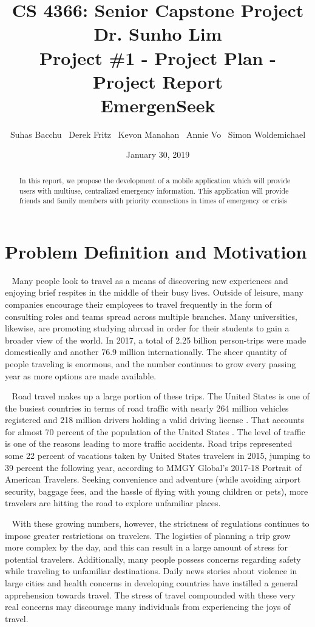 \documentclass[10pt]{article}
\title{CS 4366: Senior Capstone Project \\ Dr. Sunho Lim \\ Project \#1 - Project Plan - Project Report \\ EmergenSeek}
\author{Suhas Bacchu \ Derek Fritz \ Kevon Manahan \ Annie Vo \ Simon Woldemichael}
\date{January 30, 2019}
\begin{document}
\maketitle

\begin{abstract}
In this report, we propose the development of a mobile application which will provide users with multiuse, centralized emergency information. This application will provide friends and family members with priority connections in times of emergency or crisis
\end{abstract}

\section{Problem Definition and Motivation}
\par ~ Many people look to travel as a means of discovering new experiences and enjoying brief respites in the middle of their busy lives. Outside of leisure, many companies encourage their employees to travel frequently in the form of consulting roles and teams spread across multiple branches. Many universities, likewise, are promoting studying abroad in order for their students to gain a broader view of the world. In 2017, a total of 2.25 billion person-trips were made domestically and another 76.9 million internationally. The sheer quantity of people traveling is enormous, and the number continues to grow every passing year as more options are made available.

\par ~ Road travel makes up a large portion of these trips. The United States is one of the busiest countries in terms of road traffic with nearly 264 million vehicles registered and 218 million drivers holding a valid driving license \cite{two}. That accounts for almost 70 percent of the population of the United States \cite{two}. The level of traffic is one of the reasons leading to more traffic accidents. Road trips represented some 22 percent of vacations taken by United States travelers in 2015, jumping to 39 percent the following year, according to MMGY Global's 2017-18 Portrait of American Travelers. Seeking convenience and adventure (while avoiding airport security, baggage fees, and the hassle of flying with young children or pets), more travelers are hitting the road to explore unfamiliar places.

\par ~ With these growing numbers, however, the strictness of regulations continues to impose greater restrictions on travelers. The logistics of planning a trip grow more complex by the day, and this can result in a large amount of stress for potential travelers. Additionally, many people possess concerns regarding safety while traveling to unfamiliar destinations. Daily news stories about violence in large cities and health concerns in developing countries have instilled a general apprehension towards travel. The stress of travel compounded with these very real concerns may discourage many individuals from experiencing the joys of travel.
\end{document}
